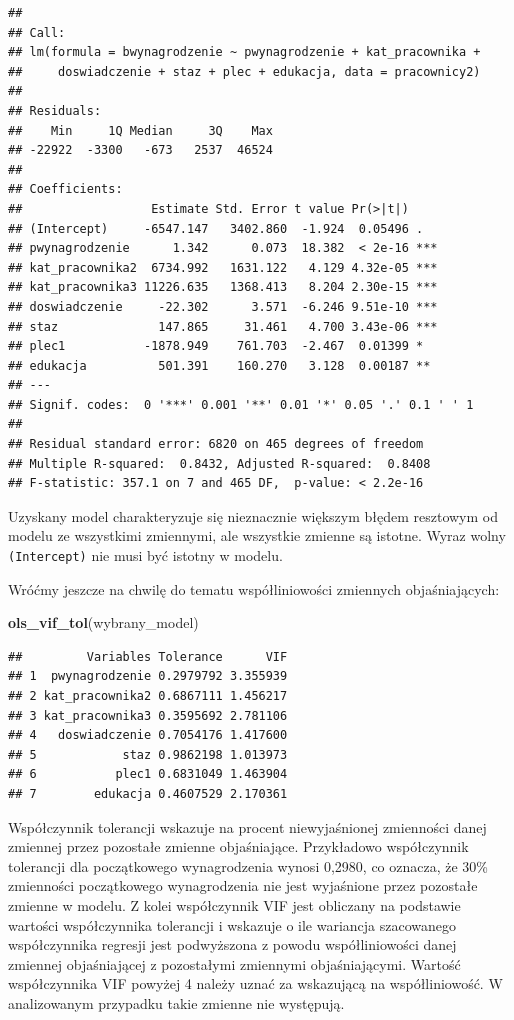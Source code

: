 \documentclass[
]{book}
\newenvironment{Shaded}{\begin{snugshade}}{\end{snugshade}}
\newcommand{\KeywordTok}[1]{\textcolor[rgb]{0.13,0.29,0.53}{\textbf{#1}}}
\newcommand{\NormalTok}[1]{#1}
\begin{document}
\begin{verbatim}
## 
## Call:
## lm(formula = bwynagrodzenie ~ pwynagrodzenie + kat_pracownika + 
##     doswiadczenie + staz + plec + edukacja, data = pracownicy2)
## 
## Residuals:
##    Min     1Q Median     3Q    Max 
## -22922  -3300   -673   2537  46524 
## 
## Coefficients:
##                  Estimate Std. Error t value Pr(>|t|)    
## (Intercept)     -6547.147   3402.860  -1.924  0.05496 .  
## pwynagrodzenie      1.342      0.073  18.382  < 2e-16 ***
## kat_pracownika2  6734.992   1631.122   4.129 4.32e-05 ***
## kat_pracownika3 11226.635   1368.413   8.204 2.30e-15 ***
## doswiadczenie     -22.302      3.571  -6.246 9.51e-10 ***
## staz              147.865     31.461   4.700 3.43e-06 ***
## plec1           -1878.949    761.703  -2.467  0.01399 *  
## edukacja          501.391    160.270   3.128  0.00187 ** 
## ---
## Signif. codes:  0 '***' 0.001 '**' 0.01 '*' 0.05 '.' 0.1 ' ' 1
## 
## Residual standard error: 6820 on 465 degrees of freedom
## Multiple R-squared:  0.8432, Adjusted R-squared:  0.8408 
## F-statistic: 357.1 on 7 and 465 DF,  p-value: < 2.2e-16
\end{verbatim}

Uzyskany model charakteryzuje się nieznacznie większym błędem resztowym od modelu ze wszystkimi zmiennymi, ale wszystkie zmienne są istotne. Wyraz wolny \texttt{(Intercept)} nie musi być istotny w modelu.

Wróćmy jeszcze na chwilę do tematu współliniowości zmiennych objaśniających:

\begin{Shaded}
\begin{Highlighting}[]
\KeywordTok{ols_vif_tol}\NormalTok{(wybrany_model)}
\end{Highlighting}
\end{Shaded}

\begin{verbatim}
##         Variables Tolerance      VIF
## 1  pwynagrodzenie 0.2979792 3.355939
## 2 kat_pracownika2 0.6867111 1.456217
## 3 kat_pracownika3 0.3595692 2.781106
## 4   doswiadczenie 0.7054176 1.417600
## 5            staz 0.9862198 1.013973
## 6           plec1 0.6831049 1.463904
## 7        edukacja 0.4607529 2.170361
\end{verbatim}

Współczynnik tolerancji wskazuje na procent niewyjaśnionej zmienności danej zmiennej przez pozostałe zmienne objaśniające. Przykładowo współczynnik tolerancji dla początkowego wynagrodzenia wynosi 0,2980, co oznacza, że 30\% zmienności początkowego wynagrodzenia nie jest wyjaśnione przez pozostałe zmienne w modelu. Z kolei współczynnik VIF jest obliczany na podstawie wartości współczynnika tolerancji i wskazuje o ile wariancja szacowanego współczynnika regresji jest podwyższona z powodu współliniowości danej zmiennej objaśniającej z pozostałymi zmiennymi objaśniającymi. Wartość współczynnika VIF powyżej 4 należy uznać za wskazującą na współliniowość. W analizowanym przypadku takie zmienne nie występują.
\end{document}
